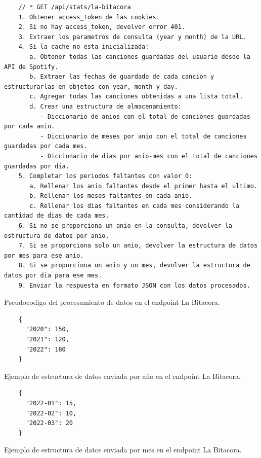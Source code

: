 \begin{ifalgorithm}[H]
    \begin{lstlisting}
    // * GET /api/stats/la-bitacora
    1. Obtener access_token de las cookies.
    2. Si no hay access_token, devolver error 401.
    3. Extraer los parametros de consulta (year y month) de la URL.
    4. Si la cache no esta inicializada:
       a. Obtener todas las canciones guardadas del usuario desde la API de Spotify.
       b. Extraer las fechas de guardado de cada cancion y estructurarlas en objetos con year, month y day.
       c. Agregar todas las canciones obtenidas a una lista total.
       d. Crear una estructura de almacenamiento:
          - Diccionario de anios con el total de canciones guardadas por cada anio.
          - Diccionario de meses por anio con el total de canciones guardadas por cada mes.
          - Diccionario de dias por anio-mes con el total de canciones guardadas por dia.
    5. Completar los periodos faltantes con valor 0:
       a. Rellenar los anio faltantes desde el primer hasta el ultimo.
       b. Rellenar los meses faltantes en cada anio.
       c. Rellenar los dias faltantes en cada mes considerando la cantidad de dias de cada mes.
    6. Si no se proporciona un anio en la consulta, devolver la estructura de datos por anio.
    7. Si se proporciona solo un anio, devolver la estructura de datos por mes para ese anio.
    8. Si se proporciona un anio y un mes, devolver la estructura de datos por dia para ese mes.
    9. Enviar la respuesta en formato JSON con los datos procesados.
    \end{lstlisting}
    \caption{Pseudocodigo del procesamiento de datos en el endpoint La Bitacora.}
    \label{alg:la_bitacora}
\end{ifalgorithm}

\begin{ifalgorithm}[H]
    \begin{lstlisting}
    {
      "2020": 150,
      "2021": 120,
      "2022": 180
    }
    \end{lstlisting}
    \caption{Ejemplo de estructura de datos enviada por año en el endpoint La Bitacora.}
    \label{alg:la_bitacora_response_year}
\end{ifalgorithm}

\begin{ifalgorithm}[H]
    \begin{lstlisting}
    {
      "2022-01": 15,
      "2022-02": 10,
      "2022-03": 20
    }
    \end{lstlisting}
    \caption{Ejemplo de estructura de datos enviada por mes en el endpoint La Bitacora.}
    \label{alg:la_bitacora_response_month}
\end{ifalgorithm}

